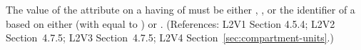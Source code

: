 The value of the  attribute on a \Compartment having
 of  must be either ,
, or the identifier of a \UnitDefinition based on
either  (with  equal to ) or
.  (References: L2V1 Section 4.5.4; L2V2
Section~4.7.5; L2V3 Section~4.7.5; L2V4 Section~\ref{sec:compartment-units}.)
